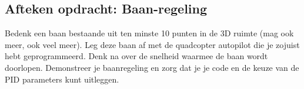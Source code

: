 \documentclass[a4paper,11pt]{article}
\begin{document}
\subsection{Afteken opdracht: Baan-regeling}
Bedenk een baan bestaande uit ten minste 10 punten in de 3D ruimte (mag ook meer, ook veel meer). Leg deze baan af met de quadcopter autopilot die je zojuist hebt geprogrammeerd. Denk na over de snelheid waarmee de baan wordt doorlopen.
Demonstreer je baanregeling en zorg dat je je code en de keuze van de PID parameters kunt uitleggen.

\end{document}
